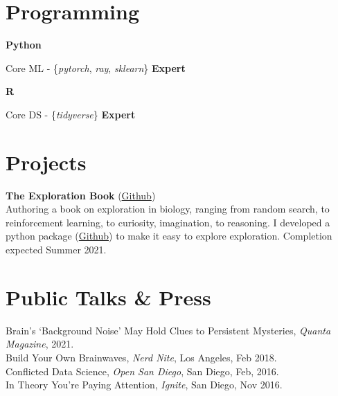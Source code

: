 \documentclass[margin,line]{res}
\newenvironment{list1}{
    \begin{list}{\ding{113}}{%
        \setlength{\itemsep}{0in}
        \setlength{\parsep}{0in} \setlength{\parskip}{0in}
        \setlength{\topsep}{0in} \setlength{\partopsep}{0in}
        \setlength{\leftmargin}{0.17in}}}{
    \end{list}}
\begin{document}
\begin{resume}
\section{\sc Programming}
\vspace{-.1cm}
{\bf Python}\\
\vspace*{-.15in}
\begin{list1}
    \tightlist
    \item[] Core ML - \{\emph{pytorch}, \emph{ray}, \emph{sklearn}\} \hfill {\bf Expert}
\end{list1}

\vspace{-.5cm}
{\bf R} \\
\vspace*{-.2in}
\begin{list1}
    \tightlist
    \item[] Core DS - \{\emph{tidyverse}\} \hfill {\bf Expert}
\end{list1}



\vspace{-.1cm}
\section{\sc Projects}
\vspace{-.1cm}
{\bf The Exploration Book} (\href{https://github.com/parenthetical-e/explorations-book}{Github}) \\
Authoring a book on exploration in biology, ranging from random search, to reinforcement learning, to curiosity, imagination, to reasoning. I developed a python package (\href{https://github.com/parenthetical-e/explorationlib}{Github}) to make it easy to explore exploration. Completion expected Summer 2021.

\vspace{-.2cm}
\section{\sc Public Talks \& Press}
Brain's `Background Noise' May Hold Clues to Persistent Mysteries, \emph{Quanta Magazine}, 2021. \\
Build Your Own Brainwaves, \emph{Nerd Nite}, Los Angeles, Feb 2018. \\
Conflicted Data Science, \emph{Open San Diego}, San Diego, Feb, 2016. \\
In Theory You're Paying Attention, \emph{Ignite}, San Diego, Nov 2016. \\
    

\end{resume}
\end{document}
